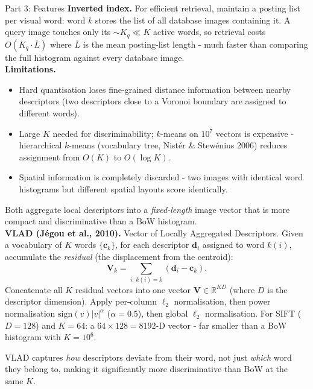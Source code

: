\documentclass[letterpaper]{article}
\begin{document}
\begin{notes}{Part 3: Features}
\textbf{Inverted index.} For efficient retrieval, maintain a posting list per visual word: word $k$ stores the list of all database images containing it. A query image touches only its $\sim\!K_q \ll K$ active words, so retrieval costs $O(K_q \cdot \bar{L})$ where $\bar{L}$ is the mean posting-list length - much faster than comparing the full histogram against every database image.\\

\textbf{Limitations.}
\begin{itemize}
    \item Hard quantisation loses fine-grained distance information between nearby descriptors (two descriptors close to a Voronoi boundary are assigned to different words).
    \item Large $K$ needed for discriminability; $k$-means on $10^7$ vectors is expensive - hierarchical $k$-means (vocabulary tree, Nistér \& Stewénius 2006) reduces assignment from $O(K)$ to $O(\log K)$.
    \item Spatial information is completely discarded - two images with identical word histograms but different spatial layouts score identically.
\end{itemize}


Both aggregate local descriptors into a \emph{fixed-length} image vector that is more compact and discriminative than a BoW histogram.\\

\textbf{VLAD (Jégou et al., 2010).} Vector of Locally Aggregated Descriptors. Given a vocabulary of $K$ words $\{\mathbf{c}_k\}$, for each descriptor $\mathbf{d}_i$ assigned to word $k(i)$, accumulate the \emph{residual} (the displacement from the centroid):
$$\mathbf{V}_k = \sum_{i:\,k(i)=k} (\mathbf{d}_i - \mathbf{c}_k).$$
Concatenate all $K$ residual vectors into one vector $\mathbf{V} \in \mathbb{R}^{KD}$ (where $D$ is the descriptor dimension). Apply per-column $\ell_2$ normalisation, then power normalisation $\mathrm{sign}(v)|v|^\alpha$ ($\alpha=0.5$), then global $\ell_2$ normalisation. For SIFT ($D=128$) and $K=64$: a $64\times128 = 8192$-D vector - far smaller than a BoW histogram with $K=10^6$.

VLAD captures \emph{how} descriptors deviate from their word, not just \emph{which} word they belong to, making it significantly more discriminative than BoW at the same $K$.\\


\end{notes}
\end{document}
